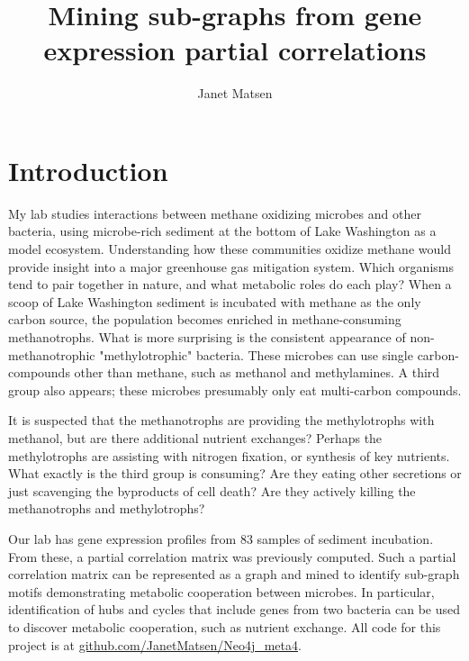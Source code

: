 \documentclass[12pt]{article}
\begin{document}
 
\title{Mining sub-graphs from gene expression partial correlations}
\author{Janet Matsen}
\maketitle

\section{Introduction} %

My lab studies interactions between methane oxidizing microbes and other bacteria, using microbe-rich sediment at the bottom of Lake Washington as a model ecosystem. 
Understanding how these communities oxidize methane would provide insight into a major greenhouse gas mitigation system. 
Which organisms tend to pair together in nature, and what metabolic roles do each play?  
When a scoop of Lake Washington sediment is incubated with methane as the only carbon source, the population becomes enriched in methane-consuming methanotrophs.
What is more surprising is the consistent appearance of non-methanotrophic "methylotrophic" bacteria.
These microbes can use single carbon-compounds other than methane, such as methanol and methylamines. 
A third group also appears; these microbes presumably only eat multi-carbon compounds.

It is suspected that the methanotrophs are providing the methylotrophs with methanol, but are there additional nutrient exchanges?
Perhaps the methylotrophs are assisting with nitrogen fixation, or synthesis of key nutrients. 
What exactly is the third group is consuming?  
Are they eating other secretions or just scavenging the byproducts of cell death?
Are they actively killing the methanotrophs and methylotrophs?

Our lab has gene expression profiles from 83 samples of sediment incubation. 
From these, a partial correlation matrix was previously computed. 
Such a partial correlation matrix can be represented as a graph and mined to identify sub-graph motifs demonstrating metabolic cooperation between microbes. 
In particular, identification of hubs and cycles that include genes from two bacteria can be used to discover metabolic cooperation, such as nutrient exchange. 
All code for this project is at \href{https://github.com/JanetMatsen/Neo4j_meta4}{github.com/JanetMatsen/Neo4j\_meta4}.

\end{document}
